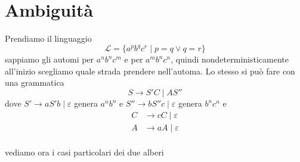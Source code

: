\documentclass[12pt]{report}
\theoremstyle{definition}
\begin{document}
\section{Ambiguità}
Prendiamo il linguaggio
$$ \mathcal{L} = \{ a^p b^q c^r \mid p = q \vee q = r \} $$
sappiamo gli automi per $a^n b^n c^m$ e per $a^m b^n c^n$, %
quindi nondeterministicamente all'inizio scegliamo quale strada prendere nell'automa.
Lo stesso si può fare con una grammatica
$$ S \rightarrow S' C \mid A S'' $$
dove $S' \rightarrow a S' b \mid \varepsilon $ genera $a^n b^n$
e $S'' \rightarrow b S'' c \mid \varepsilon $ genera $b^n c^n$
e 
\begin{align*}
	C &\rightarrow c C \mid \varepsilon \\
	A &\rightarrow a A \mid \varepsilon \\
\end{align*}
\begin{center}
\end{center}
vediamo ora i casi particolari dei due alberi
\end{document}
